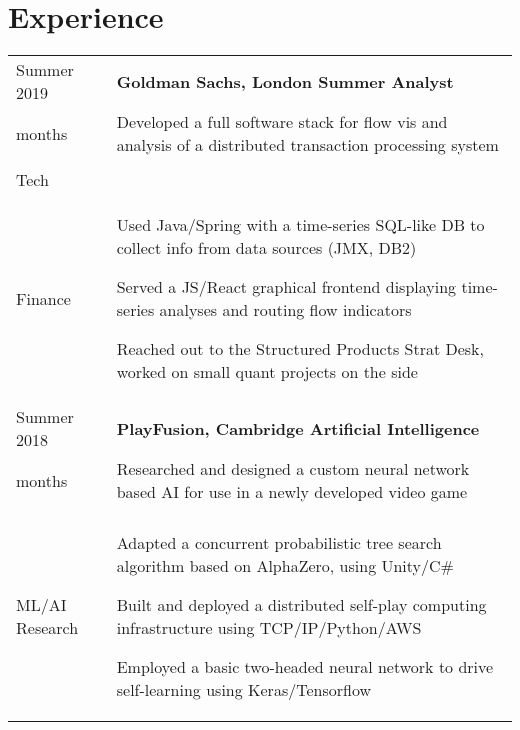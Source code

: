 \documentclass[letterpaper, 10pt]{article}
\begin{document}

\section*{Experience}
\begin{tabularx}{\linewidth}{>{\raggedleft}p{2.2cm}|X}
Summer 2019 & \textbf{Goldman Sachs, London \hfill Summer Analyst}\\
3 months & Developed a full software stack for flow vis and analysis of a distributed transaction processing system\\
\textit{\\Tech\\Finance} &
\vspace{-.5\baselineskip}
\begin{compact}
	\item Used Java/Spring with a time-series SQL-like DB to collect info from data sources (JMX, DB2)
    \item Served a JS/React graphical frontend displaying time-series analyses and routing flow indicators
	\item Reached out to the Structured Products Strat Desk, worked on small quant projects on the side
	\vspace{-1.5\baselineskip}
\end{compact}\\
Summer 2018 & \textbf{PlayFusion, Cambridge \hfill Artificial Intelligence}\\
3 months & Researched and designed a custom neural network based AI for use in a newly developed video game\\
\textit{\\ML/AI Research} &
\vspace{-.5\baselineskip}
\begin{compact}
	\item Adapted a concurrent probabilistic tree search algorithm based on AlphaZero, using Unity/C\#
	\item Built and deployed a distributed self-play computing infrastructure using TCP/IP/Python/AWS
	\item Employed a basic two-headed neural network to drive self-learning using Keras/Tensorflow

\end{compact}
\end{tabularx}
\end{document}
